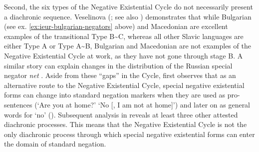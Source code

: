 \documentclass[output=paper]{langsci/langscibook}
\begin{document}
Second, the six types of the Negative Existential Cycle do not necessarily
present a diachronic sequence. Veselinova
(\citet[1336--1337]{Veselinova2014}; see also
\citealt[22]{Croft1991}) demonstrates that while Bulgarian (see ex.
\ref{ex:ieur-bulgarian-negators}
above) and Macedonian are excellent examples of the transitional Type
B{\textasciitilde}C, whereas all other Slavic languages are either Type A
or Type A{\textasciitilde}B, Bulgarian and Macedonian are not examples of
the Negative
Existential Cycle at work, as they have not gone through stage B. A similar
story can explain changes in the distribution of the Russian special
negator \textit{net} \parencite[1335, 1337--1338]{Veselinova2014}. Aside
from these ``gaps'' in the Cycle, \citet[127]{Veselinova2013} first observes
that as an alternative route to the Negative Existential Cycle, special
negative existential forms can change into standard negation markers when
they are used as pro-sentences (`Are you at home?' `No [, I am not at
home]') and later on as general words for `no' (\citealt[see
also][1339]{Veselinova2014}). Subsequent analysis in
\citet[155ff]{Veselinova2016}
 reveals at least three other attested diachronic processes. This
means that the Negative Existential Cycle is not the only diachronic
process through which special negative existential forms can enter the
domain of standard negation.  
\end{document}
